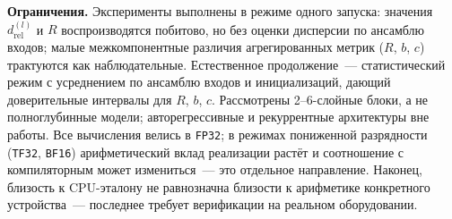 \textbf{Ограничения.} Эксперименты выполнены в режиме одного запуска: значения
$d_{\text{rel}}^{(l)}$ и $R$ воспроизводятся побитово, но без оценки дисперсии по
ансамблю входов; малые межкомпонентные различия агрегированных метрик ($R$, $b$,
$c$) трактуются как наблюдательные. Естественное продолжение~--- статистический
режим с усреднением по ансамблю входов и инициализаций, дающий доверительные
интервалы для $R$, $b$, $c$. Рассмотрены 2--6-слойные блоки, а не полноглубинные
модели; авторегрессивные и рекуррентные архитектуры вне работы. Все вычисления
велись в \texttt{FP32}; в режимах пониженной разрядности (\texttt{TF32},
\texttt{BF16}) арифметический вклад реализации растёт и соотношение с
компиляторным может измениться~--- это отдельное направление. Наконец, близость к
CPU-эталону не равнозначна близости к арифметике конкретного устройства~---
последнее требует верификации на реальном оборудовании.
